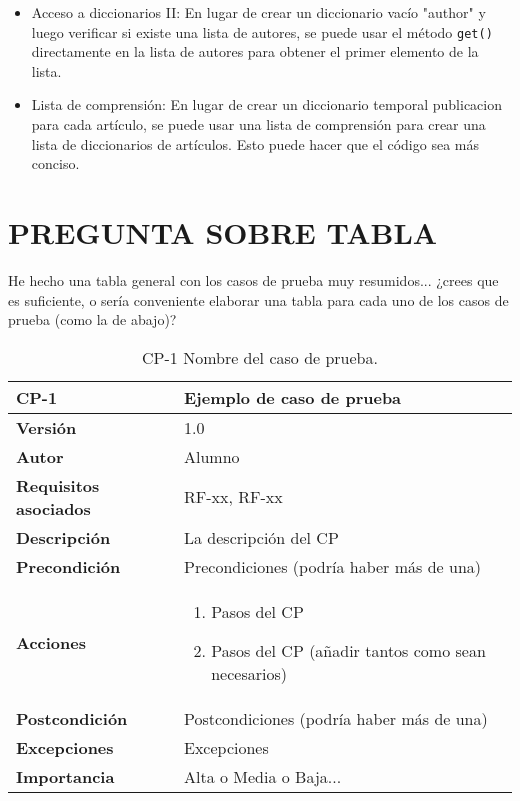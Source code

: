 \begin{itemize}
    \item Acceso a diccionarios II:
    En lugar de crear un diccionario vacío "author" y luego verificar si existe una lista de autores, se puede usar el método \verb|get()| directamente en la lista de autores para obtener el primer elemento de la lista.

    \item Lista de comprensión:
    En lugar de crear un diccionario temporal publicacion para cada artículo, se puede usar una lista de comprensión para crear una lista de diccionarios de artículos. Esto puede hacer que el código sea más conciso.
	
    
\end{itemize}





\section{PREGUNTA SOBRE TABLA}

He hecho una tabla general con los casos de prueba muy resumidos... ¿crees que es suficiente, o sería conveniente elaborar una tabla para cada uno de los casos de prueba (como la de abajo)?

\begin{table}[p]
	\centering
	\begin{tabularx}{\linewidth}{ p{} p{} }
		\toprule
		\textbf{CP-1}    & \textbf{Ejemplo de caso de prueba}\\
		\toprule
		\textbf{Versión}              & 1.0    \\
		\textbf{Autor}                & Alumno \\
		\textbf{Requisitos asociados} & RF-xx, RF-xx \\
		\textbf{Descripción}          & La descripción del CP \\
		\textbf{Precondición}         & Precondiciones (podría haber más de una) \\
		\textbf{Acciones}             &
		\begin{enumerate}
			\def\labelenumi{\arabic{enumi}.}
			\tightlist
			\item Pasos del CP
			\item Pasos del CP (añadir tantos como sean necesarios)
		\end{enumerate}\\
		\textbf{Postcondición}        & Postcondiciones (podría haber más de una) \\
		\textbf{Excepciones}          & Excepciones \\
		\textbf{Importancia}          & Alta o Media o Baja... \\
		\bottomrule
	\end{tabularx}
	\caption{CP-1 Nombre del caso de prueba.}
\end{table}


	
	